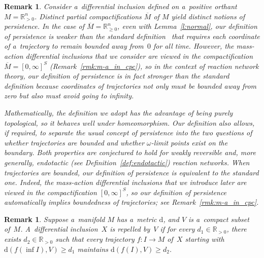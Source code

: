 \documentclass[11pt]{article}
\newtheorem{Remark}[Theorem]{Remark}
\newcommand\ol[1]{{\overline {#1}}}
\begin{document}
\begin{Remark}
\label{rmk:def_pers}
Consider a~dif\/ferential inclusion def\/ined on a~positive orthant $M=\mathbb{R}_{>0}^n$.
Distinct partial compactif\/ications $\ol M$ of $M$ yield distinct notions of persistence.
In the case of $\ol M=\mathbb{R}_{\geq 0}^n$, even with Lemma~\ref{l:normal}, our def\/inition of persistence is weaker
than the standard def\/inition~\cite{Freed} that requires each coordinate of a~trajectory to remain bounded away
from~$0$ for all time.
However, the mass-action dif\/ferential inclusions that we consider are viewed in the compactif\/ication $\ol
M=[0,\infty]^S$ (Remark~\ref{rmk:m-a_in_cpc}), so in the context of reaction network theory, our def\/inition of
persistence is in fact stronger than the standard def\/inition because coordinates of trajectories not only must be
bounded away from zero but also must avoid going to inf\/inity.

Mathematically, the def\/inition we adopt has the advantage of being purely topological, so it behaves well under
homeomorphism.
Our def\/inition also allows, if required, to separate the usual concept of persistence into the two questions of
whether trajectories are bounded and whether $\omega$-limit points exist on the boundary.
Both properties are conjectured to hold for weakly reversible and, more generally, endotactic (see
Def\/inition~\ref{def:endotactic}) reaction networks.
When trajectories are bounded, our def\/inition of persistence is equivalent to the standard one.
Indeed, the mass-action dif\/ferential inclusions that we introduce later are viewed in the compactif\/ication
$[0,\infty]^{S}$, so our def\/inition of persistence automatically implies boundedness of trajectories; see
Remark~\ref{rmk:m-a_in_cpc}.
\end{Remark}

\begin{Remark}
\label{rmk:repel_dist}
Suppose a~manifold $M$ has a~metric $\mathrm{d}$, and $V$ is a~compact subset of~$M$.
A~dif\/ferential inclusion~$X$ is repelled by~$V$ if for every $d_1\in\mathbb{R}_{>0}$, there exists
$d_2\in\mathbb{R}_{>0}$ such that every trajectory $f:I\to M$ of~$X$ starting with $\mathrm{d}(f(\inf{I}),V)\geq d_1$
maintains $\mathrm{d}(f(I),V)\geq d_2$.
\end{Remark}
\end{document}
